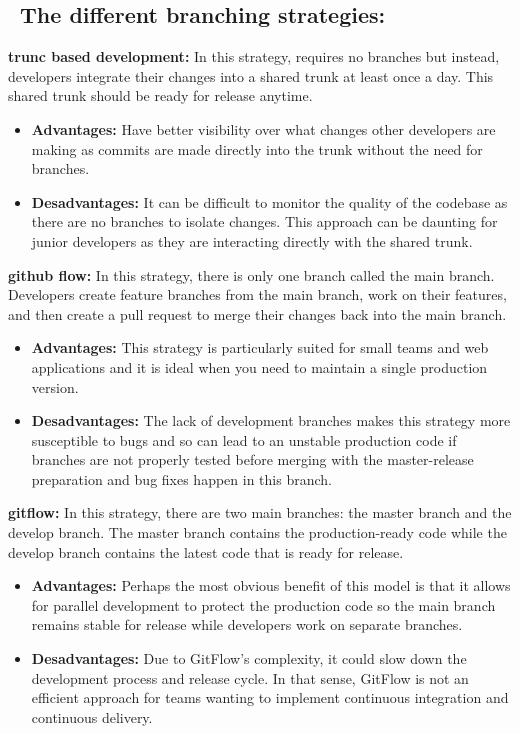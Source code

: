 \subsection*{ \textbullet\ The different branching strategies\cite{gitBranching}:}
\textbf{trunc based development:} In this strategy, requires no branches but instead, developers integrate their changes into a shared trunk at least once a day. This shared trunk should be ready for release anytime.
\begin{itemize}
    \item \textbf{Advantages:} Have better visibility over what changes other developers are making as commits are made directly into the trunk without the need for branches.
    \item \textbf{Desadvantages:} It can be difficult to monitor the quality of the codebase as there are no branches to isolate changes. This approach can be daunting for junior developers as they are interacting directly with the shared trunk.
\end{itemize}
\par
\textbf{github flow:} In this strategy, there is only one branch called the main branch. Developers create feature branches from the main branch, work on their features, and then create a pull request to merge their changes back into the main branch.
\begin{itemize}
    \item \textbf{Advantages:} This strategy is particularly suited for small teams and web applications and it is ideal when you need to maintain a single production version.
    \item \textbf{Desadvantages:} The lack of development branches makes this strategy more susceptible to bugs and so can lead to an unstable production code if branches are not properly tested before merging with the master-release preparation and bug fixes happen in this branch.
\end{itemize}
\par
\textbf{gitflow:} In this strategy, there are two main branches: the master branch and the develop branch. The master branch contains the production-ready code while the develop branch contains the latest code that is ready for release.
\begin{itemize}
    \item \textbf{Advantages:} Perhaps the most obvious benefit of this model is that it allows for parallel development to protect the production code so the main branch remains stable for release while developers work on separate branches.
    \item \textbf{Desadvantages:} Due to GitFlow's complexity, it could slow down the development process and release cycle. In that sense, GitFlow is not an efficient approach for teams wanting to implement continuous integration and continuous delivery.
\end{itemize}
